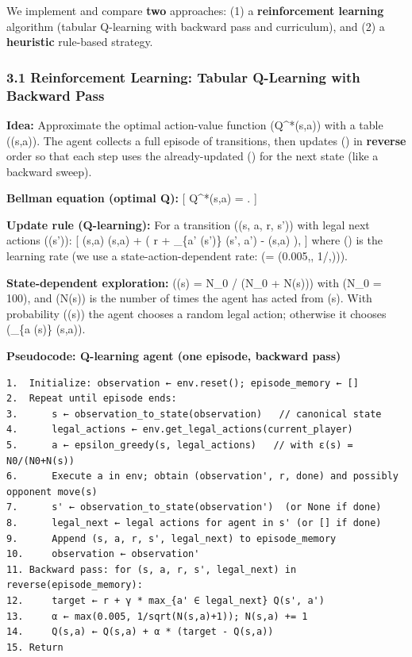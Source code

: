 \documentclass[
]{article}
\begin{document}
We implement and compare \textbf{two} approaches: (1) a
\textbf{reinforcement learning} algorithm (tabular Q-learning with
backward pass and curriculum), and (2) a \textbf{heuristic} rule-based
strategy.

\subsubsection{3.1 Reinforcement Learning: Tabular Q-Learning with
Backward
Pass}\label{reinforcement-learning-tabular-q-learning-with-backward-pass}

\textbf{Idea:} Approximate the optimal action-value function
(Q\^{}*(s,a)) with a table ((s,a)). The agent collects a full
episode of transitions, then updates () in \textbf{reverse} order
so that each step uses the already-updated () for the next state
(like a backward sweep).

\textbf{Bellman equation (optimal Q):} {[} Q\^{}*(s,a) =
\bigl[ R + \gamma \max_{a'} Q^*(S', a') \bigm| S=s, A=a \bigr].
{]}

\textbf{Update rule (Q-learning):} For a transition ((s, a, r, s')) with
legal next actions ((s')): {[} (s,a)
\leftarrow {}(s,a) + \alpha \Bigl( r + \gamma \max\_\{a'
\in {}(s')\} (s', a') - (s,a) \Bigr), {]} where
(\alpha) is the learning rate (we use a state-action-dependent rate:
(\alpha = \max\bigl(0.005,, 1\big/,\bigr))).

\textbf{State-dependent exploration:} (\varepsilon(s) = N\_0 \big/ (N\_0
+ N(s))) with (N\_0 = 100), and (N(s)) is the number of times the agent
has acted from (s). With probability (\varepsilon(s)) the agent chooses
a random legal action; otherwise it chooses (\arg\max\_\{a
\in {}(s)\} (s,a)).

\textbf{Pseudocode: Q-learning agent (one episode, backward pass)}

\begin{verbatim}
1.  Initialize: observation ← env.reset(); episode_memory ← []
2.  Repeat until episode ends:
3.      s ← observation_to_state(observation)   // canonical state
4.      legal_actions ← env.get_legal_actions(current_player)
5.      a ← epsilon_greedy(s, legal_actions)   // with ε(s) = N0/(N0+N(s))
6.      Execute a in env; obtain (observation', r, done) and possibly opponent move(s)
7.      s' ← observation_to_state(observation')  (or None if done)
8.      legal_next ← legal actions for agent in s' (or [] if done)
9.      Append (s, a, r, s', legal_next) to episode_memory
10.     observation ← observation'
11. Backward pass: for (s, a, r, s', legal_next) in reverse(episode_memory):
12.     target ← r + γ * max_{a' ∈ legal_next} Q(s', a')
13.     α ← max(0.005, 1/sqrt(N(s,a)+1)); N(s,a) += 1
14.     Q(s,a) ← Q(s,a) + α * (target - Q(s,a))
15. Return
\end{verbatim}
\end{document}
